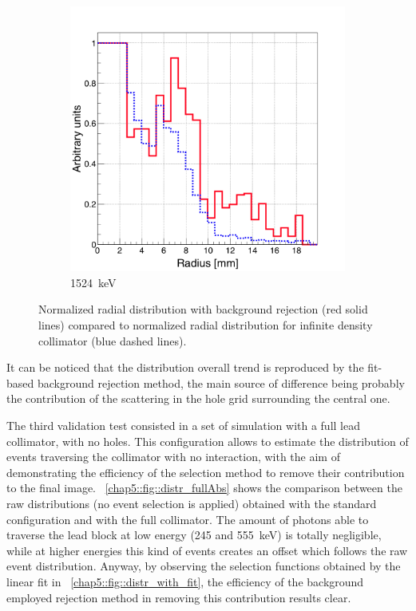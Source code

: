 \begin{figure}
\begin{subfigure}{.5\textwidth}
  \label{chap5::fig::rad_distr_infAbs_1099keV}
\end{subfigure}
\begin{subfigure}{.5\textwidth}
  \centering
  \includegraphics[width=.9\linewidth]{03_GraphicFiles/chapter5_SPECTsimu/SPECT/anger/inf_abs/overlap_infAbs_1524keV_normMax}
  \caption{1524~keV}
  \label{chap5::fig::rad_distr_infAbs_1524keV}
\end{subfigure}
\caption{Normalized radial distribution with background rejection (red solid lines) compared to normalized radial distribution for infinite density collimator (blue dashed lines).}
\label{chap5::fig::distr_infAbs}
\end{figure}

It can be noticed that the distribution overall trend is reproduced by the fit-based background rejection method, the main source of difference being probably the contribution of the scattering in the hole grid surrounding the central one.

The third validation test consisted in a set of simulation with a full lead collimator, with no holes. This configuration allows to estimate the distribution of events traversing the collimator with no interaction, with the aim of demonstrating the efficiency of the selection method to remove their contribution to the final image. \figurename~\ref{chap5::fig::distr_fullAbs} shows the comparison between the raw distributions (no event selection is applied) obtained with the standard configuration and with the full collimator. The amount of photons able to traverse the lead block at low energy (245 and 555~keV) is totally negligible, while at higher energies this kind of events creates an offset which follows the raw event distribution. Anyway, by observing the selection functions obtained by the linear fit in \figurename~\ref{chap5::fig::distr_with_fit}, the efficiency of the background employed rejection method in removing this contribution results clear.  

